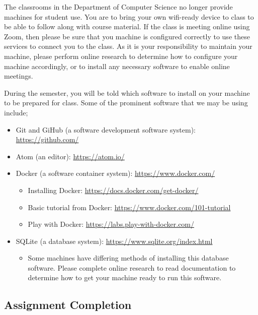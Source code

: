 \documentclass[11pt]{article} %
\begin{document}
The classrooms in the Department of Computer Science no longer provide machines for student use. You are to bring your own wifi-ready device to class to be able to follow along with course material. If the class is meeting online using Zoom, then please be sure that you machine is configured correctly to use these services to connect you to the class. As it is your responsibility to maintain your machine, please perform online research to determine how to configure your machine accordingly, or to install any necessary software to enable online meetings. 

During the semester, you will be told which software to install on your machine to be prepared for class. Some of the prominent software that we may be using include;

\begin{itemize}
\item Git and GiHub (a software development software system): \url{https://github.com/}
\item Atom (an editor): \url{https://atom.io/}
\item Docker (a software container system): \url{https://www.docker.com/}
	\begin{itemize}
		\item Installing Docker: \url{https://docs.docker.com/get-docker/}
		\item Basic tutorial from Docker: \url{https://www.docker.com/101-tutorial}
		\item Play with Docker: \url{https://labs.play-with-docker.com/}
	\end{itemize}
	\item SQLite (a database system): \url{https://www.sqlite.org/index.html}
	\begin{itemize}
		\item Some machines have differing methods of installing this database software. Please complete online research to read documentation to determine how to get your machine ready to run this software. 
	\end{itemize}
\end{itemize}








\vspace{-.1in}
\subsection*{\textbf{Assignment Completion}}
\end{document}
